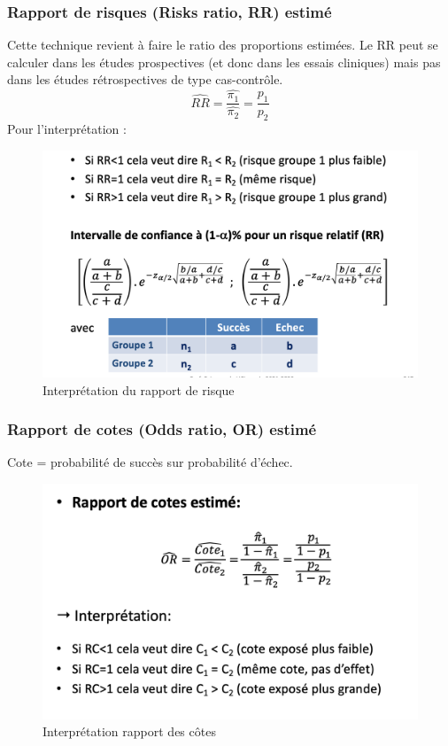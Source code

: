 \subsubsection{Rapport de risques (Risks ratio, RR) estimé}
Cette technique revient à faire le ratio des proportions estimées. Le RR peut se calculer dans les études prospectives (et donc dans les essais cliniques) mais pas dans les études rétrospectives de type cas-contrôle.
$$\hat{RR} = \frac{\hat{\pi_{1}}}{\hat{\pi_{2}}}=\frac{p_{1}}{p_{2}} $$
Pour l'interprétation :
\begin{figure}[H]
    \centering
    \includegraphics[scale = 0.5]{images/interpretationrisqueration.png}
    \caption{Interprétation du rapport de risque}
    \label{fig:my_label}
\end{figure}

\subsubsection{Rapport de cotes (Odds ratio, OR) estimé}

Cote = probabilité de succès sur probabilité d’échec.

\begin{figure}[H]
    \centering
    \includegraphics[scale=0.5]{images/rapportdescotes.png}
    \caption{Interprétation rapport des côtes}
    \label{fig:my_label}
\end{figure}


